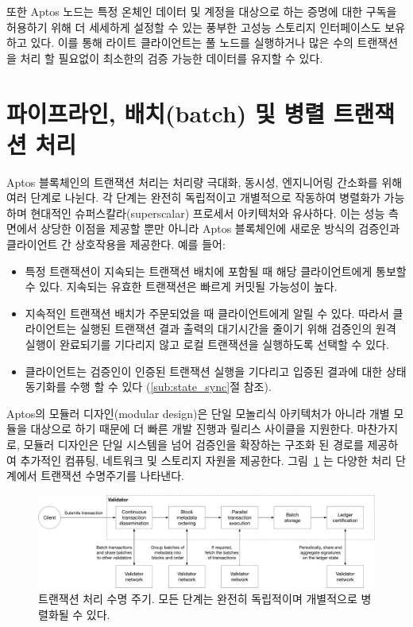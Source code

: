 \documentclass{article}
\begin{document}
또한 Aptos 노드는 특정 온체인 데이터 및 계정을 대상으로 하는 증명에 대한 구독을 허용하기 위해 더 세세하게 설정할 수 있는 풍부한 고성능 스토리지 인터페이스도 보유하고 있다. 이를 통해 라이트 클라이언트는 풀 노드를 실행하거나 많은 수의 트랜잭션을 처리 할 필요없이 최소한의 검증 가능한 데이터를 유지할 수 있다.

\section{파이프라인, 배치(batch) 및 병렬 트랜잭션 처리}
\label{sec:pipelining_batching}

Aptos 블록체인의 트랜잭션 처리는 처리량 극대화, 동시성, 엔지니어링 간소화를 위해 여러 단계로 나뉜다. 각 단계는 완전히 독립적이고 개별적으로 작동하여 병렬화가 가능하며 현대적인 슈퍼스칼라(superscalar) 프로세서 아키텍처와 유사하다. 이는 성능 측면에서 상당한 이점을 제공할 뿐만 아니라 Aptos 블록체인에 새로운 방식의 검증인과 클라이언트 간 상호작용을 제공한다. 예를 들어:
\begin{itemize}
\item 특정 트랜잭션이 지속되는 트랜잭션 배치에 포함될 때 해당 클라이언트에게 통보할 수 있다. 지속되는 유효한 트랜잭션은 빠르게 커밋될 가능성이 높다.
\item 지속적인 트랜잭션 배치가 주문되었을 때 클라이언트에게 알릴 수 있다. 따라서 클라이언트는 실행된 트랜잭션 결과 출력의 대기시간을 줄이기 위해 검증인의 원격 실행이 완료되기를 기다리지 않고 로컬 트랜잭션을 실행하도록 선택할 수 있다. 
\item 클라이언트는 검증인이 인증된 트랜잭션 실행을 기다리고 입증된 결과에 대한 상태 동기화를 수행 할 수 있다 (\ref{sub:state_sync}절 참조).
\end{itemize}
Aptos의 모듈러 디자인(modular design)은 단일 모놀리식 아키텍처가 아니라 개별 모듈을 대상으로 하기 때문에 더 빠른 개발 진행과 릴리스 사이클을 지원한다. 마찬가지로, 모듈러 디자인은 단일 시스템을 넘어 검증인을 확장하는 구조화 된 경로를 제공하여 추가적인 컴퓨팅, 네트워크 및 스토리지 자원을 제공한다. 그림~\ref{fig:pipeline} 는 다양한 처리 단계에서 트랜잭션 수명주기를 나타낸다.

\begin{figure}
\centering
\includegraphics[width=1.0\textwidth]{pipeline.pdf}
\caption{\label{fig:pipeline}트랜잭션 처리 수명 주기. 모든 단계는 완전히 독립적이며 개별적으로 병렬화될 수 있다.}
\end{figure}
\end{document}
